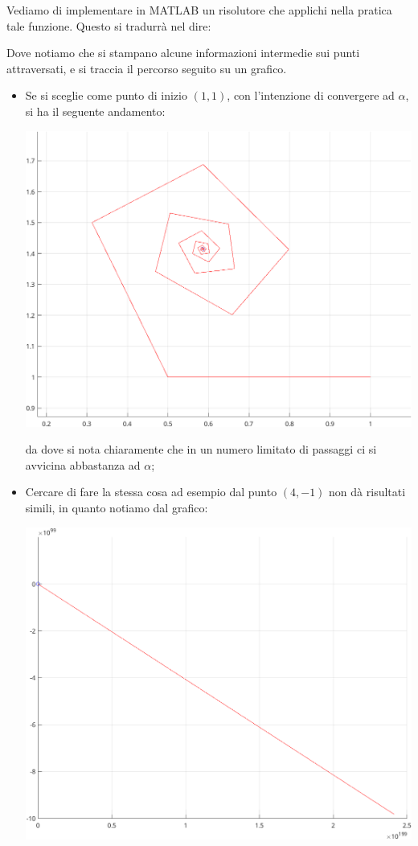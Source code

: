 \documentclass[a4paper,11pt]{article}
\begin{document}
Vediamo di implementare in MATLAB un risolutore che applichi nella pratica tale funzione.
Questo si tradurrà nel dire:
\lstset{style=codestyle, language=MATLAB}


Dove notiamo che si stampano alcune informazioni intermedie sui punti attraversati, e si traccia il percorso seguito su un grafico.

\begin{itemize}
	\item Se si sceglie come punto di inizio $(1, 1)$, con l'intenzione di convergere ad $\alpha$, si ha il seguente andamento:
		\begin{center}
			\includegraphics[scale=1]{../figures/nonlin_ex.png}
		\end{center}
		da dove si nota chiaramente che in un numero limitato di passaggi ci si avvicina abbastanza ad $\alpha$;
		\newpage
	\item Cercare di fare la stessa cosa ad esempio dal punto $(4, -1)$ non dà risultati simili, in quanto notiamo dal grafico:
		\begin{center}
			\includegraphics[scale=1]{../figures/nonlin_ex2.png}

\end{center}
\end{itemize}
\end{document}
